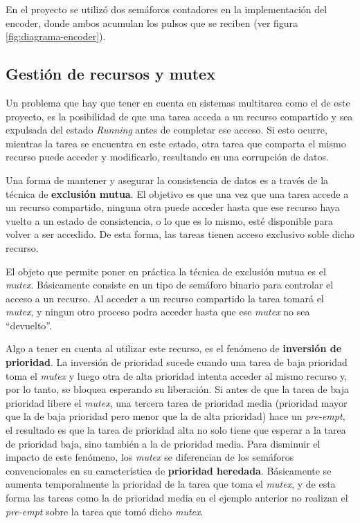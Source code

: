\documentclass{IEEEtran}
\begin{document}
En el proyecto se utilizó dos semáforos contadores en la implementación del encoder, donde ambos acumulan los pulsos que se reciben (ver figura \ref{fig:diagrama-encoder}).

\subsection{Gestión de recursos y mutex}
Un problema que hay que tener en cuenta en sistemas multitarea como el de este proyecto, es la posibilidad de que una tarea acceda a un recurso compartido y sea expulsada del estado \textit{Running} antes de completar ese acceso. Si esto ocurre, mientras la tarea se encuentra en este estado, otra tarea que comparta el mismo recurso puede acceder y modificarlo, resultando en una corrupción de datos.

Una forma de mantener y asegurar la consistencia de datos es a través de la técnica de \textbf{exclusión mutua}. El objetivo es que una vez que una tarea accede a un recurso compartido, ninguna otra puede acceder hasta que ese recurso haya vuelto a un estado de consistencia, o lo que es lo mismo, esté disponible para volver a ser accedido. De esta forma, las tareas tienen acceso exclusivo soble dicho recurso.

El objeto que permite poner en práctica la técnica de exclusión mutua es el \textit{mutex}. Básicamente consiste en un tipo de semáforo binario para controlar el acceso a un recurso. Al acceder a un recurso compartido la tarea tomará el \textit{mutex}, y ningun otro proceso podra acceder hasta que ese \textit{mutex} no sea ``devuelto''.

Algo a tener en cuenta al utilizar este recurso, es el fenómeno de \textbf{inversión de prioridad}. La inversión de prioridad sucede cuando una tarea de baja prioridad toma el \textit{mutex} y luego otra de alta prioridad intenta acceder al mismo recurso y, por lo tanto, se bloquea esperando su liberación. Si antes de que la tarea de baja prioridad libere el \textit{mutex}, una tercera tarea de prioridad media (prioridad mayor que la de baja prioridad pero menor que la de alta prioridad) hace un \textit{pre-empt}, el resultado es que la tarea de prioridad alta no solo tiene que esperar a la tarea de prioridad baja, sino también a la de prioridad media. Para disminuir el impacto de este fenómeno, los \textit{mutex} se diferencian de los semáforos convencionales en su característica de \textbf{prioridad heredada}. Básicamente se aumenta temporalmente la prioridad de la tarea que toma el \textit{mutex}, y de esta forma las tareas como la de prioridad media en el ejemplo anterior no realizan el \textit{pre-empt} sobre la tarea que tomó dicho \textit{mutex}.
\end{document}
